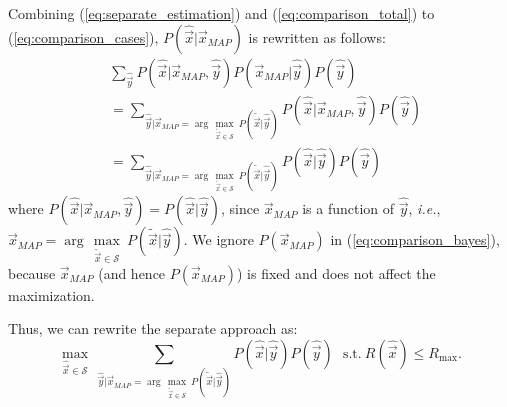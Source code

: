 Combining (\ref{eq:separate_estimation}) and (\ref{eq:comparison_total}) to (\ref{eq:comparison_cases}), $P(\hat{\vec{x}}|\vec{x}_{MAP})$ is rewritten as follows:
\begin{equation}
\begin{split}
&\sum_{\hat{\vec{y}}} P(\hat{\vec{x}}|\vec{x}_{MAP},\hat{\vec{y}}) P(\vec{x}_{MAP}|\hat{\vec{y}}) P(\hat{\vec{y}}) \\
&= \sum_{\hat{\vec{y}}|\vec{x}_{MAP} = \arg\,\underset{\tilde{\vec{x}}\in  \mathcal{S}}{\max} \ P(\tilde{\vec{x}}|\hat{\vec{y}})} P(\hat{\vec{x}}|\vec{x}_{MAP},\hat{\vec{y}}) P(\hat{\vec{y}}) \\
&= \sum_{\hat{\vec{y}}|\vec{x}_{MAP} = \arg\,\underset{\tilde{\vec{x}}\in  \mathcal{S}}{\max} \ P(\tilde{\vec{x}}|\hat{\vec{y}})} P(\hat{\vec{x}}|\hat{\vec{y}}) P(\hat{\vec{y}})
\end{split}
\end{equation}
where $P(\hat{\vec{x}}|\vec{x}_{MAP},\hat{\vec{y}}) = P(\hat{\vec{x}}|\hat{\vec{y}})$, since $\vec{x}_{MAP}$ is a function of $\hat{\vec{y}}$, \textit{i.e.}, $\vec{x}_{MAP} = \arg\,\underset{\tilde{\vec{x}}\in  \mathcal{S}}{\max} \ P(\tilde{\vec{x}}|\hat{\vec{y}})$. 
We ignore $P(\vec{x}_{MAP})$ in (\ref{eq:comparison_bayes}), because $\vec{x}_{MAP}$ (and hence $P(\vec{x}_{MAP})$) is fixed and does not affect the maximization.

Thus, we can rewrite the separate approach as:
\begin{equation}
\underset{\hat{\vec{x}}\in  \mathcal{S}}{\max}\ \sum_{\hat{\vec{y}}|\vec{x}_{MAP} = \arg\,\underset{\tilde{\vec{x}}\in  \mathcal{S}}{\max} \ P(\tilde{\vec{x}}|\hat{\vec{y}})} P(\hat{\vec{x}}|\hat{\vec{y}}) P(\hat{\vec{y}}) ~~~ \mbox{s.t.} ~ 
R(\hat{\vec{x}})\leq  R_{\max}.
\label{eq:comprison_separate}
\end{equation}

